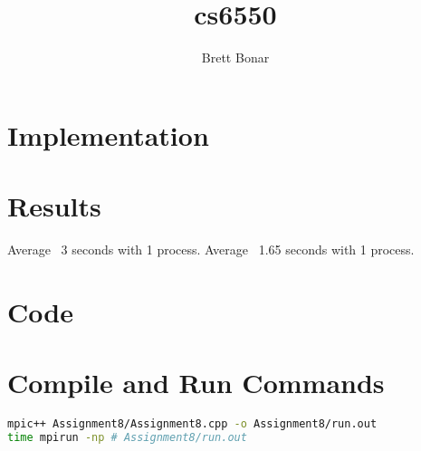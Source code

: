 \documentclass{article}
\title{cs6550}
\author{ Brett Bonar }
\begin{document}
\maketitle

\section{Implementation}


\section{Results}
Average ~3 seconds with 1 process.
Average ~1.65 seconds with 1 process.

\section{Code}



\section{Compile and Run Commands}
\begin{lstlisting}[language=bash]
mpic++ Assignment8/Assignment8.cpp -o Assignment8/run.out
time mpirun -np # Assignment8/run.out
\end{lstlisting}
\end{document}
